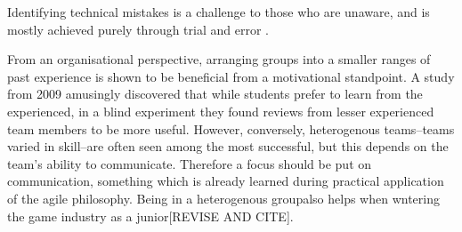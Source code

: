 \documentclass{scrartcl}
\begin{document}
Identifying technical mistakes is a challenge to those who are unaware, and is mostly achieved purely through trial and error \cite{capstone}. 

From an organisational perspective, arranging groups into a smaller ranges of past experience is shown to be beneficial from a motivational standpoint. A study from 2009 \cite{peerreview} amusingly discovered that while students prefer to learn from the experienced, in a blind experiment they found reviews from lesser experienced team members to be more useful.\cite{peerreview} However, conversely, heterogenous teams--teams varied in skill--are often seen among the most successful, but this depends on the team's ability to communicate. \cite{group2003} Therefore a focus should be put on communication, something which is already learned during practical application of the agile philosophy. Being in a heterogenous groupalso helps when wntering the game industry as a junior[REVISE AND CITE].

 

\end{document}
